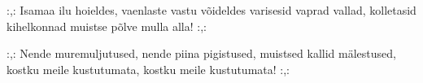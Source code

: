 :,: Isamaa ilu hoieldes,
vaenlaste vastu v\~oideldes
varisesid vaprad vallad,
kolletasid kihelkonnad
muistse p\~olve mulla alla! :,:

:,: Nende muremuljutused,
nende piina pigistused,
muistsed kallid m\"alestused,
kostku meile kustutumata,
kostku meile kustutumata! :,: